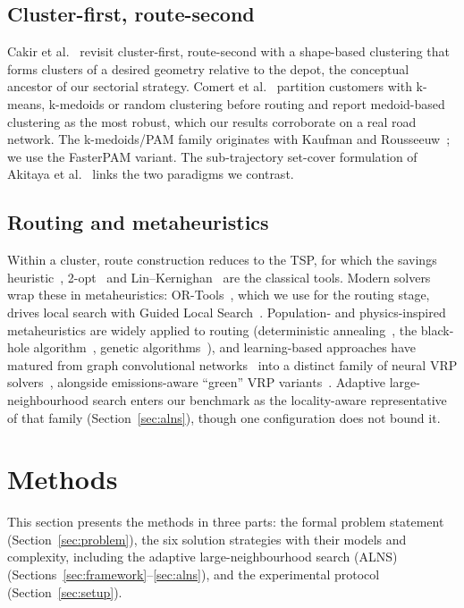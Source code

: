 \documentclass[graybox]{SNmult}
\begin{document}
\subsection{Cluster-first, route-second}
Cakir et al.~\cite{CakirRevisitingProblem} revisit cluster-first,
route-second with a shape-based clustering that forms clusters of a
desired geometry relative to the depot, the conceptual ancestor of our
sectorial strategy. Comert et al.~\cite{Comert2018AStudy} partition
customers with k-means, k-medoids or random clustering before routing and
report medoid-based clustering as the most robust, which our results
corroborate on a real road network. The k-medoids/PAM family originates
with Kaufman and Rousseeuw~\cite{KaufmanRousseeuw1990PAM}; we use the
FasterPAM variant. The sub-trajectory set-cover formulation of Akitaya et
al.~\cite{Akitaya2021Subtrajectory} links the two paradigms we
contrast.

\subsection{Routing and metaheuristics}
Within a cluster, route construction reduces to the TSP, for which the
savings heuristic~\cite{ClarkeWright1964Savings}, 2-opt~\cite{Croes1958TwoOpt}
and Lin--Kernighan~\cite{HelsgaunAnHeuristic} are the classical tools.
Modern solvers wrap these in metaheuristics: OR-Tools~\cite{PerronFurnon2023ORTools},
which we use for the routing stage, drives local search with Guided Local
Search~\cite{Voudouris1999GLS}. Population- and physics-inspired
metaheuristics are widely applied to routing (deterministic
annealing~\cite{Baranwal2016DAVRPTW}, the black-hole
algorithm~\cite{Hatamlou2018BlackHole}, genetic
algorithms~\cite{Holland1992Adaptation}), and learning-based approaches
have matured from graph convolutional
networks~\cite{Joshi2019GCN,Dahiya2018TSPReview} into a distinct family of
neural VRP solvers~\cite{Wu2024NCOSurvey}, alongside emissions-aware
``green'' VRP variants~\cite{Sabet2022GreenVRP}. Adaptive
large-neighbourhood search enters our benchmark as the locality-aware
representative of that family (Section~\ref{sec:alns}), though one
configuration does not bound it.

\section{Methods}\label{sec:methods}
This section presents the methods in three parts: the formal problem
statement (Section~\ref{sec:problem}), the six solution strategies
with their models and complexity, including the adaptive
large-neighbourhood search (ALNS)
(Sections~\ref{sec:framework}--\ref{sec:alns}), and the experimental
protocol (Section~\ref{sec:setup}).
\end{document}
